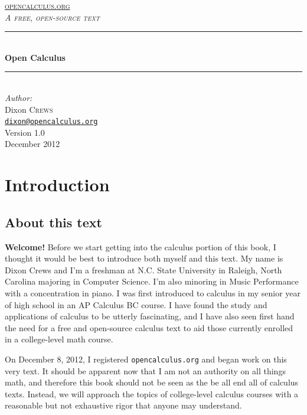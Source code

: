 \documentclass[oneside]{article}
\begin{document}
\begin{titlepage}

\newcommand{\HRule}{\rule{\linewidth}{0.5mm}} 

\center

\textsc{\large \href{http://opencalculus.org}{opencalculus.org}}\\[1.5cm] 
\textsc{\Large \textit{A free, open-source text}}\\[0.5cm] 

\HRule \\[0.4cm]
{ \huge \bfseries Open Calculus}\\[0.4cm]
\HRule \\[1.5cm]

\Large \emph{Author:}\\
Dixon \textsc{Crews}\\[0.5cm]
\small \texttt{\href{mailto:dixon@opencalculus.org}{dixon@opencalculus.org}} \\ [3.5cm]

{\large Version 1.0}\\[1cm]
{\large December 2012}\\[3cm]

\vfill 

\end{titlepage}

\tableofcontents
\vfill

\section{Introduction}
\subsection{About this text}
\textbf{Welcome!} Before we start getting into the calculus portion of this book, I thought it would be best to introduce both myself and this text. My name is Dixon Crews and I'm a freshman at N.C. State University in Raleigh, North Carolina majoring in Computer Science. I'm also minoring in Music Performance with a concentration in piano. I was first introduced to calculus in my senior year of high school in an AP Calculus BC course. I have found the study and applications of calculus to be utterly fascinating, and I have also seen first hand the need for a free and open-source calculus text to aid those currently enrolled in a college-level math course.

On December 8, 2012, I registered \texttt{opencalculus.org} and began work on this very text. It should be apparent now that I am not an authority on all things math, and therefore this book should not be seen as the be all end all of calculus texts. Instead, we will approach the topics of college-level calculus courses with a reasonable but not exhaustive rigor that anyone may understand.
\end{document}
